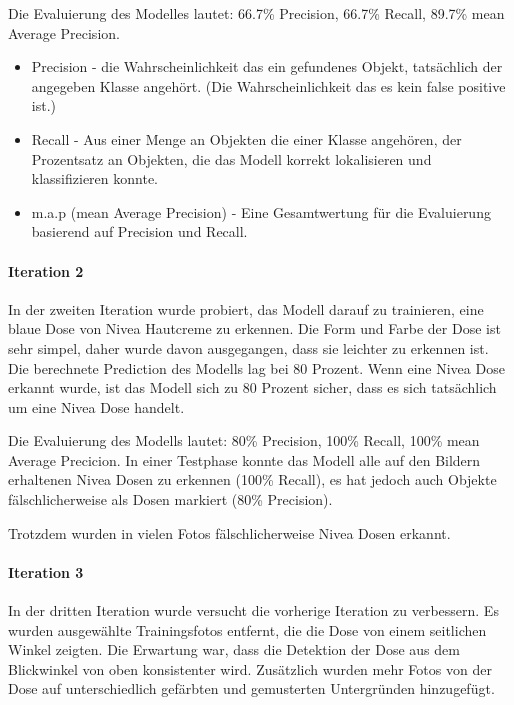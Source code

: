 Die Evaluierung des Modelles lautet: 66.7\% Precision, 66.7\% Recall, 89.7\% mean Average Precision.

\begin{itemize}
	\item Precision - die Wahrscheinlichkeit das ein gefundenes Objekt, tatsächlich der angegeben Klasse angehört. (Die Wahrscheinlichkeit das es kein false positive ist.)
	\item Recall - Aus einer Menge an Objekten die einer Klasse angehören, der Prozentsatz an Objekten, die das Modell korrekt lokalisieren und klassifizieren konnte.
	\item m.a.p (mean Average Precision) - Eine Gesamtwertung für die Evaluierung basierend auf Precision und Recall. 
\end{itemize}

\paragraph{Iteration 2}

In der zweiten Iteration wurde probiert, das Modell darauf zu trainieren, eine blaue Dose von Nivea Hautcreme zu erkennen. Die Form und Farbe der Dose ist sehr simpel, daher wurde davon ausgegangen, dass sie leichter zu erkennen ist. Die berechnete Prediction des Modells lag bei 80 Prozent. Wenn eine Nivea Dose erkannt wurde, ist das Modell sich zu 80 Prozent sicher, dass es sich tatsächlich um eine Nivea Dose handelt.

Die Evaluierung des Modells lautet: 80\% Precision, 100\% Recall, 100\% mean Average Precicion.
In einer Testphase konnte das Modell alle auf den Bildern erhaltenen Nivea Dosen zu erkennen (100\% Recall), es hat jedoch auch Objekte fälschlicherweise als Dosen markiert (80\% Precision).

Trotzdem wurden in vielen Fotos fälschlicherweise Nivea Dosen erkannt. 


\paragraph{Iteration 3}

In der dritten Iteration wurde versucht die vorherige Iteration zu verbessern. Es wurden ausgewählte Trainingsfotos entfernt, die die Dose von einem seitlichen Winkel zeigten. Die Erwartung war, dass die Detektion der Dose aus dem Blickwinkel von oben konsistenter wird. Zusätzlich wurden mehr Fotos von der Dose auf unterschiedlich gefärbten und gemusterten Untergründen hinzugefügt. 

